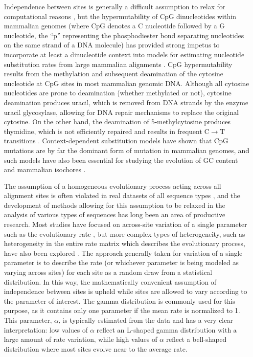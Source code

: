 Independence between sites is generally a difficult assumption to
relax for computational reasons \citep{Kosiol2006c}, but the
hypermutability of CpG dinucleotides within mammalian genomes (where
CpG denotes a C nucleotide followed by a G nucleotide, the ``p''
representing the phosphodiester bond separating nucleotides on the
same strand of a DNA molecule) has provided strong impetus to
incorporate at least a dinucleotide context into models for estimating
nucleotide substitution rates from large mammalian alignments
\citep{Blake1992,Hwang2004a,Siepel2004a}. CpG hypermutability results
from the methylation and subsequent deamination of the cytosine
nucleotide at CpG sites in most mammalian genomic DNA. Although all
cytosine nucleotides are prone to deamination (whether methylated or
not), cytosine deamination produces uracil, which is removed from DNA
strands by the enzyme uracil glycosylase, allowing for DNA repair
mechanisms to replace the original cytosine. On the other hand, the
deamination of 5-methylcytosine produces thymidine, which is not
efficiently repaired and results in frequent C$\to$T transitions
\citep{Ehrlich1982,Hwang2004a}. Context-dependent substitution models
have shown that CpG mutations are by far the dominant form of mutation
in mammalian genomes, and such models have also been essential for
studying the evolution of GC content and mammalian isochores
\citep{Duret2006,Duret2008}.

The assumption of a homogeneous evolutionary process acting across all
alignment sites is often violated in real datasets of all sequence
types \citep{Yang2006,Whelan2008}, and the development of methods
allowing for this assumption to be relaxed in the analysis of various
types of sequences has long been an area of productive research. Most
studies have focused on across-site variation of a single parameter
such as the evolutionary rate
\citep{Uzzell1971,Yang1994c,Yang1996,Nielsen1998}, but more complex
types of heterogeneity, such as heterogeneity in the entire rate
matrix which describes the evolutionary process, have also been
explored \citep{Lartillot2004} . The approach generally taken for
variation of a single parameter is to describe the rate (or whichever
parameter is being modeled as varying across sites) for each site as a
random draw from a statistical distribution. In this way, the
mathematically convenient assumption of independence between sites is
upheld while sites are allowed to vary according to the parameter of
interest. The gamma distribution is commonly used for this purpose, as
it contains only one parameter if the mean rate is normalized to
1. This parameter, $\alpha$, is typically estimated from the data and
has a very clear interpretation: low values of $\alpha$ reflect an
L-shaped gamma distribution with a large amount of rate variation,
while high values of $\alpha$ reflect a bell-shaped distribution where
most sites evolve near to the average rate.

